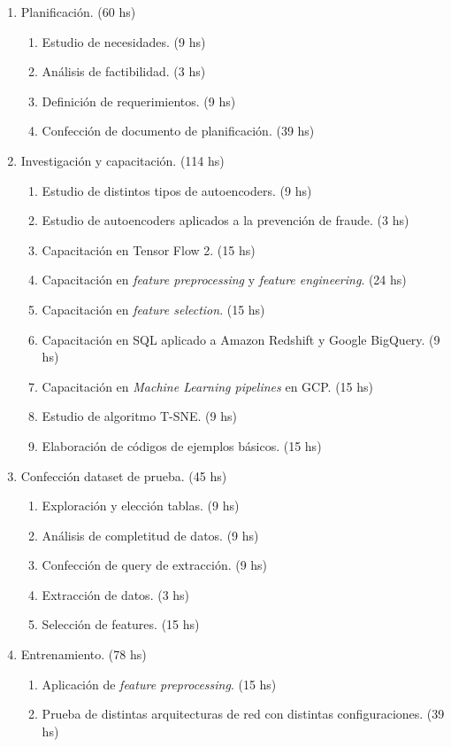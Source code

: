 \documentclass[
11pt, %
]{charter}
\begin{document}
\begin{enumerate}
\item Planificación. (60 hs)
	\begin{enumerate}
		\item Estudio de necesidades. (9 hs)
		\item Análisis de factibilidad. (3 hs)
		\item Definición de requerimientos. (9 hs)
		\item Confección de documento de planificación. (39 hs)
	\end{enumerate}
\item Investigación y capacitación. (114 hs)
	\begin{enumerate}
		\item Estudio de distintos tipos de autoencoders. (9 hs)
		\item Estudio de autoencoders aplicados a la prevención de fraude. (3 hs)
		\item Capacitación en Tensor Flow 2. (15 hs)
		\item Capacitación en \emph{feature preprocessing} y \emph{feature engineering}. (24 hs)
		\item Capacitación en \emph{feature selection}. (15 hs)
		\item Capacitación en SQL aplicado a Amazon Redshift y Google BigQuery. (9 hs)
		\item Capacitación en \emph{Machine Learning pipelines} en GCP. (15 hs)
		\item Estudio de algoritmo T-SNE. (9 hs)
		\item Elaboración de códigos de ejemplos básicos. (15 hs)
	\end{enumerate}
\item Confección dataset de prueba. (45 hs)
	\begin{enumerate}
		\item Exploración y elección tablas. (9 hs)
		\item Análisis de completitud de datos. (9 hs)
		\item Confección de query de extracción. (9 hs)
		\item Extracción de datos. (3 hs)
		\item Selección de features. (15 hs)
	\end{enumerate}
\item Entrenamiento. (78 hs)
	\begin{enumerate}
		\item Aplicación de \emph{feature preprocessing}. (15 hs)
		\item Prueba de distintas arquitecturas de red con distintas configuraciones. (39 hs)

\end{enumerate}
\end{enumerate}
\end{document}
